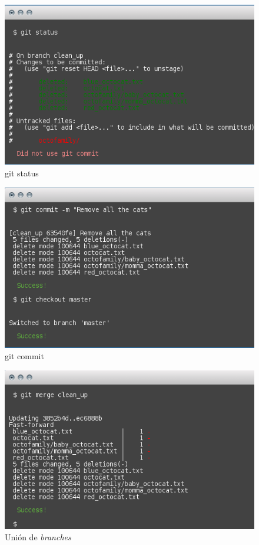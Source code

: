\documentclass[11pt]{article}
\begin{document}
\begin{figure}[H]
	\centering
	\includegraphics[scale=0.8]{git_11.png}
	\caption{git status}
	\label{fig:c11}
\end{figure}

\begin{figure}[H]
	\centering
	\includegraphics[scale=0.8]{git_12.png}
	\caption{git commit}
	\label{fig:c12}
\end{figure}

\begin{figure}[H]
	\centering
	\includegraphics[scale=0.8]{git_13.png}
	\caption{Unión de \textit{branches}}
	\label{fig:c13}
\end{figure}
\end{document}

